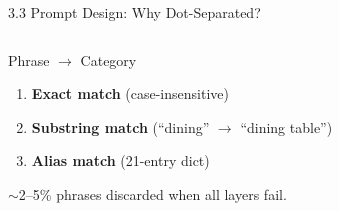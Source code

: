 \documentclass[aspectratio=169,10pt]{beamer}
\begin{document}
\begin{frame}{3.3 Prompt Design: Why Dot-Separated?}
\begin{columns}[T]
    \begin{block}{Phrase $\rightarrow$ Category}
      \footnotesize
      \begin{enumerate}\setlength{\itemsep}{2pt}
        \item \textbf{Exact match} (case-insensitive)
        \item \textbf{Substring match} (``dining'' $\rightarrow$ ``dining table'')
        \item \textbf{Alias match} (21-entry dict)
      \end{enumerate}
      $\sim$2--5\% phrases discarded when all layers fail.
    \end{block}
  \end{columns}
\end{frame}

\end{document}
